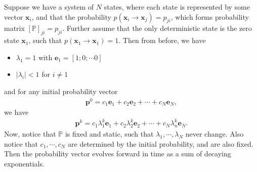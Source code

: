 \documentclass[superscriptaddress]{revtex4-1}
\newcommand{\prob}{\mathbb{P}}
\begin{document}
Suppose we have a system of $N$ states, where each state is represented by some vector $\bm{x}_i$, and that the probability $p(\bm{x}_i \rightarrow \bm{x}_j) = p_{ji}$, which forms probability matrix $[\prob]_{ji} = p_{ji}$. Further assume that the only deterministic state is the zero state $\bm{x}_1$, such that $p(\bm{x}_1 \rightarrow \bm{x}_1) = 1$. Then from before, we have
\begin{itemize}
	\item $\lambda_1 = 1$ with $\bm{e}_1 = [1; 0; \dotsm 0]$
	\item $|\lambda_i| < 1$ for $i \neq 1$
\end{itemize}
and for any initial probability vector 
\begin{align*}
\bm{p}^0 = 
c_1 \bm{e}_1 + c_2 \bm{e}_2 + \dotsm + c_N \bm{e}_N,
\end{align*}
we have
\begin{align*}
\bm{p}^k = c_1\lambda_1^k\bm{e}_1 + c_2\lambda_2^k\bm{e}_2 + \dotsm + c_N\lambda_n^k\bm{e}_N.
\end{align*}
Now, notice that $\prob$ is fixed and static, such that $\lambda_1, \dotsm, \lambda_N$ never change. Also notice that $c_1, \dotsm, c_N$ are determined by the initial probability, and are also fixed. Then the probability vector evolves forward in time as a sum of decaying exponentials. 
\end{document}
